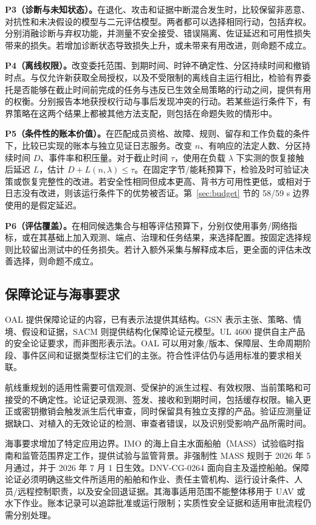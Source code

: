 \textbf{P3（诊断与未知状态）。}在退化、攻击和证据中断混合发生时，比较保留非恶意、对抗性和未决假设的模型与二元评估模型。两者都可以选择相同行动，包括弃权。分别消融诊断与弃权功能，并测量不安全接受、错误隔离、佐证延迟和可用性损失带来的损失。若增加诊断状态导致损失上升，或未带来有用改进，则命题不成立。

\textbf{P4（离线权限）。}改变委托范围、到期时间、时钟不确定性、分区持续时间和撤销时点。与仅允许新获取全局授权，以及不受限制的离线自主运行相比，检验有界委托是否能够在截止时间前完成的任务与违反已生效全局策略的行动之间，提供有用的权衡。分别报告本地获授权行动与事后发现冲突的行动。若某些运行条件下，有界策略在这两个结果上都被其他方法支配，则包括在命题失败的情形中。

\textbf{P5（条件性的账本价值）。}在匹配成员资格、故障、规则、留存和工作负载的条件下，比较已实现的账本与独立见证日志服务。改变 $n$、有响应的法定人数、分区持续时间 $D$、事件率和积压量。对于截止时间 $\tau$，使用在负载 $\lambda$ 下实测的恢复接触后延迟 $L$，估计 $D+L(n,\lambda)\leq\tau$。在固定字节/能耗预算下，检验及时可验证决策或恢复完整性的改进。若安全性相同但成本更高、背书方可用性更低，或相对于日志没有改进，则该运行条件下的优势被否证。第~\ref{sec:budget} 节的 58/59 s 边界使用的是假定延迟。

\textbf{P6（评估覆盖）。}在相同候选集合与相等评估预算下，分别仅使用事务/网络指标，或在其基础上加入观测、端点、治理和任务结果，来选择配置。按固定选择规则比较留出测试中的任务损失。若计入额外采集与解释成本后，更全面的评估未改善选择，则命题不成立。

\subsection{保障论证与海事要求}\label{sec:assurance-case}

OAL 提供保障论证的内容，已有表示法提供其结构。GSN 表示主张、策略、情境、假设和证据，SACM 则提供结构化保障论证元模型\citep{gsn2021,sacm2023}。UL 4600 提供自主产品的安全论证要求，而非图形表示法\citep{ul4600}。OAL 可以用对象/版本、保障层、生命周期阶段、事件区间和证据类型标注它们的主张。符合性评估仍与适用标准的要求相关联。

航线重规划的适用性需要可信观测、受保护的派生过程、有效权限、当前策略和可接受的不确定性。论证记录观测、签发、接收和到期时间，包括缓存权限。输入更正或密钥撤销会触发派生后代审查，同时保留具有独立支撑的产品。验证应测量证据缺口、对植入的无效论证的检测、审查者错误，以及识别受影响产品所需时间。

海事要求增加了特定应用边界。IMO 的海上自主水面船舶（MASS）试验临时指南和监管范围界定工作，提供试验与监管背景\citep{imo2019trials,imo2021scoping}。非强制性 MASS 规则于 2026 年 5 月通过，并于 2026 年 7 月 1 日生效\citep{imo2026mass}。DNV-CG-0264 面向自主及遥控船舶\citep{dnv2024autonomous}。保障论证必须明确这些文件所适用的船舶和作业、责任主管机构、运行设计条件、人员/远程控制职责，以及安全回退证据。其海事适用范围不能整体移用于 UAV 或水下作业。账本记录可以追踪批准或运行限制；实质性安全证据和适用审批流程仍需分别处理。

